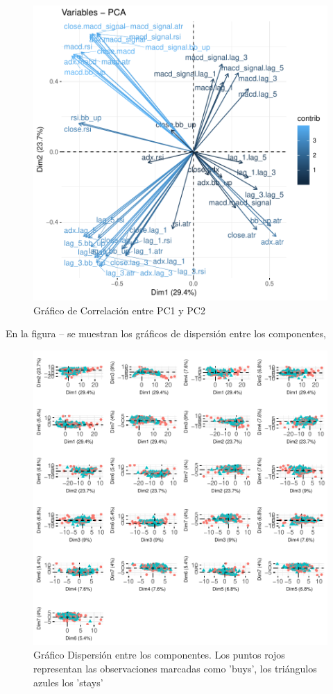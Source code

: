 \documentclass[a4paper,12pt]{Latex/Classes/PhDthesisPSnPDF}
\begin{document}
\begin{figure}[H]
\centering
\includegraphics{main-016}
\caption{Gráfico de Correlación entre PC1 y PC2}
\end{figure}

En la figura -- se muestran los gráficos de dispersión entre los componentes, 


\begin{figure}[H]
\centering
\includegraphics{main-018}
\caption{Gráfico Dispersión entre los componentes. Los puntos rojos representan las observaciones marcadas como 'buys', los triángulos azules los 'stays'}
\end{figure}
\end{document}
